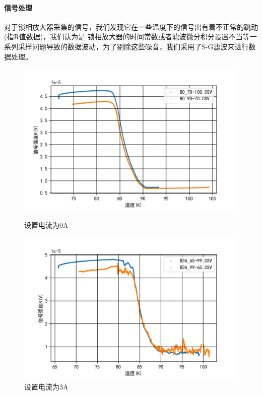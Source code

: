 \documentclass{ctexart}                                     %
\theoremstyle{ansstyle}
\begin{document}
\paragraph{信号处理} 对于锁相放大器采集的信号，我们发现它在一些温度下的信号出有着不正常的跳动(指R值数据)，我们认为是
锁相放大器的时间常数或者滤波微分积分设置不当等一系列采样问题导致的数据波动，为了剔除这些噪音，我们采用了S-G滤波来进行数据处理。
\begin{figure}[H]
    \centering
    \begin{minipage}[t]{0.48\linewidth}
        \centering
        \includegraphics[width=0.9\linewidth]{./png/2.png}
        \caption{设置电流为0A}
    \end{minipage}
    \begin{minipage}[t]{0.48\linewidth}
        \centering
        \includegraphics[width=0.9\linewidth]{./png/6.png}
        \caption{设置电流为3A}
    \end{minipage}
    \quad
    \begin{minipage}[t]{0.6\linewidth}
        \centering

\end{minipage}
\end{figure}
\end{document}
